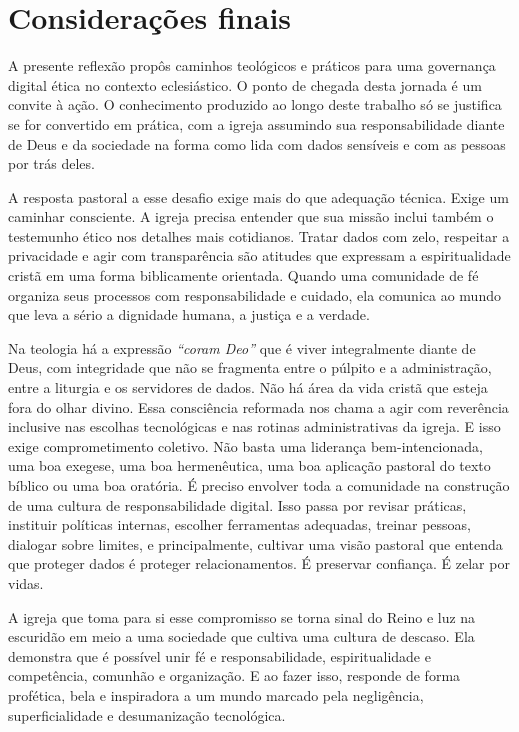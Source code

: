 \newpage
\newcommand{\tituloConsideracoesFinais}{Considerações finais}

\chapter*{\tituloConsideracoesFinais}
\addcontentsline{toc}{section}{\MakeUppercase{\tituloConsideracoesFinais}}

A presente reflexão propôs caminhos teológicos e práticos para uma governança digital ética no contexto eclesiástico. O ponto de chegada desta jornada é um convite à ação. O conhecimento produzido ao longo deste trabalho só se justifica se for convertido em prática, com a igreja assumindo sua responsabilidade diante de Deus e da sociedade na forma como lida com dados sensíveis e com as pessoas por trás deles.

A resposta pastoral a esse desafio exige mais do que adequação técnica. Exige um caminhar consciente. A igreja precisa entender que sua missão inclui também o testemunho ético nos detalhes mais cotidianos. Tratar dados com zelo, respeitar a privacidade e agir com transparência são atitudes que expressam a espiritualidade cristã em uma forma biblicamente orientada. Quando uma comunidade de fé organiza seus processos com responsabilidade e cuidado, ela comunica ao mundo que leva a sério a dignidade humana, a justiça e a verdade.

Na teologia há a expressão \textit{``coram Deo''} que é viver integralmente diante de Deus, com integridade que não se fragmenta entre o púlpito e a administração, entre a liturgia e os servidores de dados. Não há área da vida cristã que esteja fora do olhar divino. Essa consciência reformada nos chama a agir com reverência inclusive nas escolhas tecnológicas e nas rotinas administrativas da igreja. E isso exige comprometimento coletivo. Não basta uma liderança bem-intencionada, uma boa exegese, uma boa hermenêutica, uma boa aplicação pastoral do texto bíblico ou uma boa oratória. É preciso envolver toda a comunidade na construção de uma cultura de responsabilidade digital. Isso passa por revisar práticas, instituir políticas internas, escolher ferramentas adequadas, treinar pessoas, dialogar sobre limites, e principalmente, cultivar uma visão pastoral que entenda que proteger dados é proteger relacionamentos. É preservar confiança. É zelar por vidas.

A igreja que toma para si esse compromisso se torna sinal do Reino e luz na escuridão em meio a uma sociedade que cultiva uma cultura de descaso. Ela demonstra que é possível unir fé e responsabilidade, espiritualidade e competência, comunhão e organização. E ao fazer isso, responde de forma profética, bela e inspiradora a um mundo marcado pela negligência, superficialidade e desumanização tecnológica.

